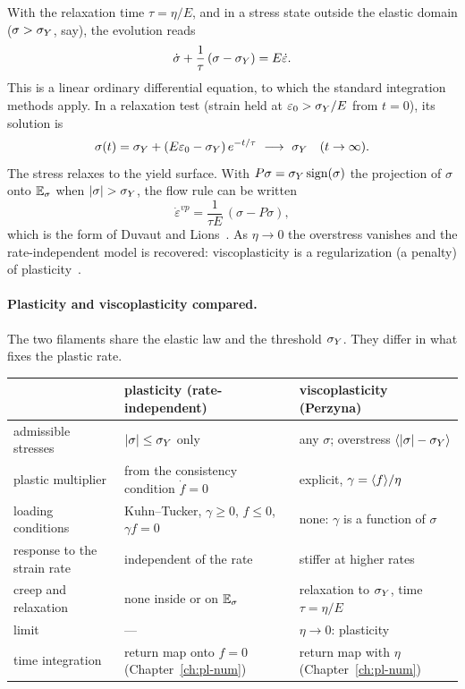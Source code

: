 With the relaxation time $\tau=\eta/E$, and in a stress state outside the
elastic domain ($\sigma>\sigma_{Y}$, say), the evolution reads
\begin{equation}\label{eq:pl-perzyna-ode}
  \dot\sigma+\frac1\tau\,(\sigma-\sigma_{Y})=E\dot\varepsilon .
\end{equation}
This is a linear ordinary differential equation, to which the standard
integration methods apply. In a relaxation test (strain held at
$\varepsilon_0>\sigma_{Y}/E$ from $t=0$), its solution is
\begin{equation}\label{eq:pl-relax}
  \sigma(t)=\sY+(E\varepsilon_0-\sY)\,e^{-t/\tau}\ \longrightarrow\ \sY\quad(t\to\infty).
\end{equation}
The stress relaxes to the yield surface. With $P\sigma=\sigma_{Y}\operatorname{sign}(\sigma)$ the
projection of $\sigma$ onto $\mathbb{E}_{\sigma}$ when $|\sigma|>\sY$, the flow rule can be
written
\begin{equation}\label{eq:pl-dl1d}
  \dot\varepsilon^{vp}=\frac{1}{\tau E}\,(\sigma-P\sigma),
\end{equation}
which is the form of Duvaut and Lions~\cite{DuvautLions1972}. As
$\eta\to0$ the overstress vanishes and the rate-independent model is
recovered: viscoplasticity is a regularization (a penalty) of
plasticity~\cite[Sec.~1.6]{SimoHughes1998}.

\paragraph{Plasticity and viscoplasticity compared.}
%
The two filaments share the elastic law and the threshold $\sigma_{Y}$. They differ
in what fixes the plastic rate.
\begin{center}\small
\renewcommand{\arraystretch}{1.2}
\begin{tabular}{@{}>{\raggedright\arraybackslash}p{3.6cm}>{\raggedright\arraybackslash}p{4.9cm}>{\raggedright\arraybackslash}p{5.6cm}@{}}
\toprule
 & plasticity (rate-independent) & viscoplasticity (Perzyna)\\
\midrule
admissible stresses & $|\sigma|\le\sigma_{Y}$ only & any $\sigma$; overstress $\langle |\sigma|-\sigma_{Y}\rangle$\\
plastic multiplier & from the consistency condition $\dot f=0$ & explicit, $\gamma=\langle f\rangle/\eta$\\
loading conditions & Kuhn--Tucker, $\gamma\ge0$, $f\le0$, $\gamma f=0$ & none: $\gamma$ is a function of $\sigma$\\
response to the strain rate & independent of the rate & stiffer at higher rates\\
creep and relaxation & none inside or on $\mathbb{E}_{\sigma}$ & relaxation to $\sigma_{Y}$, time $\tau=\eta/E$\\
limit & --- & $\eta\to0$: plasticity\\
time integration & return map onto $f=0$ (Chapter~\ref{ch:pl-num}) & return map with $\eta$ (Chapter~\ref{ch:pl-num})\\
\bottomrule
\end{tabular}
\end{center}

